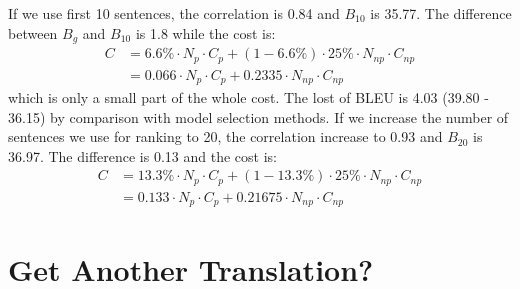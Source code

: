\documentclass[11pt]{article}
\begin{document}
  If we use first 10 sentences,  the correlation is 0.84 and  $B_{10}$ is 35.77. The difference between $B_{g}$ and $B_{10}$ is 1.8 while the cost is: \\
  \begin{align*}
  C& = 6.6\% \cdot N_{p}\cdot C_{p}  + (1-6.6\% )\cdot 25\% \cdot N_{np} \cdot C_{np}\\
   & = 0.066 \cdot N_{p}\cdot C_{p}  + 0.2335 \cdot N_{np} \cdot C_{np}
  \end{align*}
    which is only a small part of the whole cost. The lost of BLEU is 4.03 (39.80 - 36.15) by comparison with model selection methods.  If we increase the number of sentences we use for ranking to 20, the correlation increase to 0.93 and $B_{20}$ is 36.97. The difference is 0.13 and the cost is:
\begin{align*}
C& = 13.3\% \cdot N_{p}\cdot C_{p}  + (1-13.3\% )\cdot 25\% \cdot N_{np} \cdot C_{np}\\
   & = 0.133 \cdot N_{p}\cdot C_{p}  + 0.21675 \cdot N_{np} \cdot C_{np}
\end{align*}

    
     
%
%
%




 
 \section{Get Another Translation?}
 
 
\end{document}
